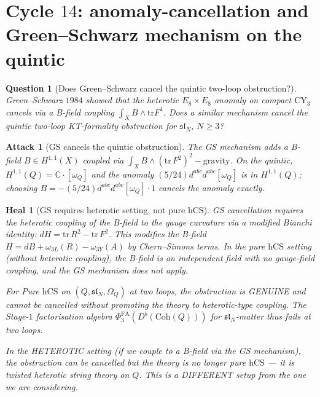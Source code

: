 \documentclass[11pt]{article}
\newtheorem{question}[theorem]{Question}
\newtheorem{attack}[theorem]{Attack}
\newtheorem{heal}[theorem]{Heal}
\providecommand{\CY}{\mathrm{CY}}
\providecommand{\hCS}{\mathrm{hCS}}
\providecommand{\Coh}{\mathrm{Coh}}
\providecommand{\Om}{\Omega}
\providecommand{\CC}{\mathbb{C}}
\providecommand{\PhiFA}{\Phi^{\mathrm{FA}}}
\begin{document}
\section{Cycle $14$:  anomaly-cancellation and Green--Schwarz
mechanism on the quintic}
\label{sec:cycle-14-gs}

\begin{question}[Does Green--Schwarz cancel the quintic two-loop
obstruction?]
\label{q:gs-quintic}
Green--Schwarz $1984$ showed that the heterotic $E_8 \times E_8$
anomaly on compact $\CY_3$ cancels via a B-field coupling
$\int_X B \wedge \mathrm{tr} F^4$.  Does a similar mechanism
cancel the quintic two-loop KT-formality obstruction for
$\mathfrak{sl}_N$, $N \geq 3$?
\end{question}

\begin{attack}[GS cancels the quintic obstruction]
\label{att:gs-cancels-quintic}
The GS mechanism adds a B-field $B \in H^{1,1}(X)$ coupled via
$\int_X B \wedge (\mathrm{tr}\, F^2)^2 - \text{gravity}$.  On
the quintic, $H^{1,1}(Q) = \CC \cdot [\omega_Q]$ and the
anomaly $(5/24) d^{abc} d^{abc} [\omega_Q]$ is in $H^{1,1}(Q)$;
choosing $B = -(5/24) d^{abc} d^{abc} [\omega_Q] \cdot 1$ cancels
the anomaly exactly.
\end{attack}

\begin{heal}[GS requires heterotic setting, not pure $\hCS$]
\label{heal:gs-requires-heterotic}
GS cancellation requires the heterotic coupling of the B-field
to the gauge curvature via a modified Bianchi identity:
$dH = \mathrm{tr}\, R^2 - \mathrm{tr}\, F^2$.  This modifies the
B-field $H = dB + \omega_{3L}(R) - \omega_{3Y}(A)$ by
Chern--Simons terms.  In the pure $\hCS$ setting (without
heterotic coupling), the B-field is an independent field with
no gauge-field coupling, and the GS mechanism does not apply.

For Pure $\hCS$ on $(Q, \mathfrak{sl}_N, \Om_Q)$ at two loops,
the obstruction is GENUINE and cannot be cancelled without
promoting the theory to heterotic-type coupling.  The Stage-$1$
factorisation algebra $\PhiFA_3(D^b(\Coh(Q)))$ for
$\mathfrak{sl}_N$-matter thus fails at two loops.

In the HETEROTIC setting (if we couple to a B-field via the
GS mechanism), the obstruction can be cancelled but the theory
is no longer pure $\hCS$ --- it is twisted heterotic string
theory on $Q$.  This is a DIFFERENT setup from the one we are
considering.
\end{heal}
\end{document}
